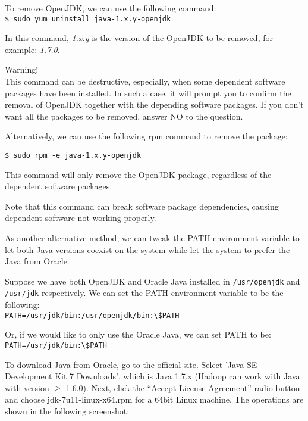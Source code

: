 To remove OpenJDK, we can use the following command: \\
\verb|$ sudo yum uninstall java-1.x.y-openjdk|

In this command, \emph{1.x.y} is the version of the OpenJDK to be removed, for example: \emph{1.7.0}. 

\begin{warning}
Warning! \\
This command can be destructive, especially, when some dependent software packages have been installed. In such a case, it will prompt you to confirm the removal of OpenJDK together with the depending software packages. If you don't want all the packages to be removed, answer NO to the question.
\end{warning}

Alternatively, we can use the following rpm command to remove the package: \\
\begin{verbatim}
$ sudo rpm -e java-1.x.y-openjdk
\end{verbatim}

This command will only remove the OpenJDK package, regardless of the dependent software packages.

Note that this command can break software package dependencies, causing dependent software not working properly.

As another alternative method, we can tweak the PATH environment variable to let both Java versions coexist on the system while let the system to prefer the Java from Oracle.

Suppose we have both OpenJDK and Oracle Java installed in \verb|/usr/openjdk| and \verb|/usr/jdk| respectively. We can set the PATH environment variable to be the following: \\
\verb|PATH=/usr/jdk/bin:/usr/openjdk/bin:\$PATH|

Or, if we would like to only use the Oracle Java, we can set PATH to be: \\
\verb|PATH=/usr/jdk/bin:\$PATH|

To download Java from Oracle, go to the \href{http://www.oracle.com/technetwork/java/javase/downloads/index.html}{official site}. Select 'Java SE Development Kit 7 Downloads', which is Java 1.7.x (Hadoop can work with Java with version $\ge$ 1.6.0). Next, click the ``Accept License Agreement'' radio button and choose jdk-7u11-linux-x64.rpm for a 64bit Linux machine. The operations are shown in the following screenshot:

